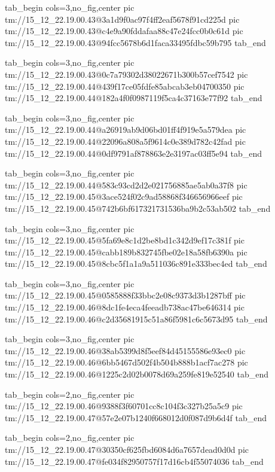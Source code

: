  
 
 
 
 

\qqSecCmtScr


\ifcmt
  tab_begin cols=3,no_fig,center
    pic tm://15_12_22.19.00.43@3a1d9f0ac97f4ff2eaf5678f91cd225d
    pic tm://15_12_22.19.00.43@c4e9a90fddafaa88c47e24fcc0b0c61d
    pic tm://15_12_22.19.00.43@94fcc5678b6d1faca33495fdbc59b795
  tab_end
\fi


\ifcmt
  tab_begin cols=3,no_fig,center
    pic tm://15_12_22.19.00.43@0c7a79302d38022671b300b57cef7542
    pic tm://15_12_22.19.00.44@439f17ce05fdfe85abcab3eb04700350
    pic tm://15_12_22.19.00.44@182a4f0f0987119f5ca4c37163e77f92
  tab_end
\fi


\ifcmt
  tab_begin cols=3,no_fig,center
    pic tm://15_12_22.19.00.44@a26919ab9d06bd01ff4f919e5a579dea
    pic tm://15_12_22.19.00.44@22096a808a5f9614c0e389d782c42fad
    pic tm://15_12_22.19.00.44@0df9791af878863e2e3197ac03ff5e94
  tab_end
\fi


\ifcmt
  tab_begin cols=3,no_fig,center
    pic tm://15_12_22.19.00.44@583c93cd2d2e021756885ae5ab0a37f8
    pic tm://15_12_22.19.00.45@3ace524f02c9ad58868f346656966eef
    pic tm://15_12_22.19.00.45@742b6bf617321731536ba9b2c53ab502
  tab_end
\fi


\ifcmt
  tab_begin cols=3,no_fig,center
    pic tm://15_12_22.19.00.45@5fa69e8c1d2be8bd1c342d9ef17c381f
    pic tm://15_12_22.19.00.45@cabb189b832745fbe02e18a58fb6390a
    pic tm://15_12_22.19.00.45@8cbc5f1a1a9a511036c891e333bec4ed
  tab_end
\fi


\ifcmt
  tab_begin cols=3,no_fig,center
    pic tm://15_12_22.19.00.45@0585888f33bbc2e08c9373d3b1287bff
    pic tm://15_12_22.19.00.46@8dc1fe4eca4feeadb738ac47be646314
    pic tm://15_12_22.19.00.46@c2d35681915c51a86f5981c6c5673d95
  tab_end
\fi


\ifcmt
  tab_begin cols=3,no_fig,center
    pic tm://15_12_22.19.00.46@38ab5399d8f5eef84d45155586e93ec0
    pic tm://15_12_22.19.00.46@6bb5467d502f4b504b888b1acf7ac278
    pic tm://15_12_22.19.00.46@1225c2d02b0078d69a259fe819e52540
  tab_end
\fi


\ifcmt
  tab_begin cols=2,no_fig,center
    pic tm://15_12_22.19.00.46@9388f3f60701cc8c104f3c327b25a5c9
    pic tm://15_12_22.19.00.47@57e2e07b1240f668012d0f087d9b6d4f
  tab_end
\fi


\ifcmt
  tab_begin cols=2,no_fig,center
    pic tm://15_12_22.19.00.47@30350cf625fbd6084d6a7657dead0d0d
    pic tm://15_12_22.19.00.47@fe034f82950757f17d16cb4f55074036
  tab_end
\fi


